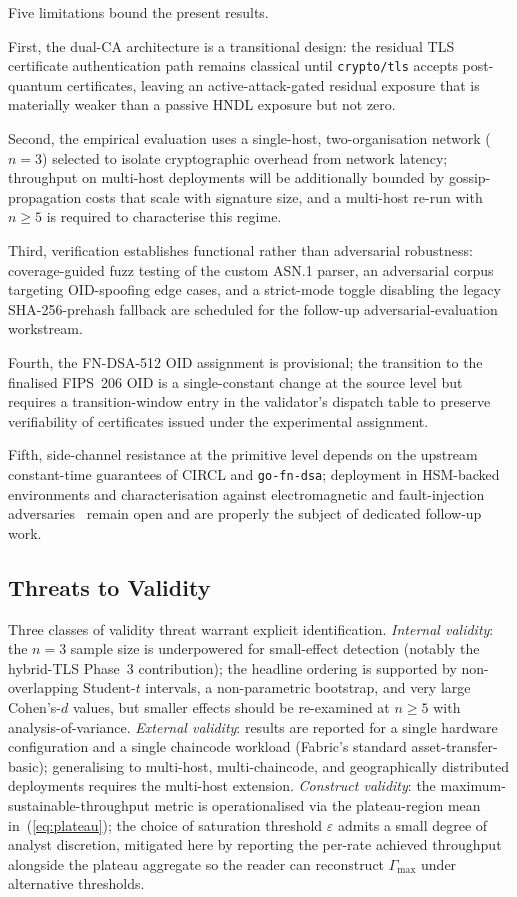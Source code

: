 \documentclass{ieeetj}
\begin{document}
Five limitations bound the present results.

First, the dual-CA architecture is a transitional design: the residual
TLS certificate authentication path remains classical until
\texttt{crypto/tls} accepts post-quantum certificates, leaving an
active-attack-gated residual exposure that is materially weaker than a
passive HNDL exposure but not zero.

Second, the empirical evaluation uses a single-host, two-organisation
network ($n=3$) selected to isolate cryptographic overhead from network
latency; throughput on multi-host deployments will be additionally bounded
by gossip-propagation costs that scale with signature size, and a
multi-host re-run with $n\geq 5$ is required to characterise this regime.

Third, verification establishes functional rather than adversarial
robustness: coverage-guided fuzz testing of the custom ASN.1 parser, an
adversarial corpus targeting OID-spoofing edge cases, and a strict-mode
toggle disabling the legacy SHA-256-prehash fallback are scheduled for the
follow-up adversarial-evaluation workstream.

Fourth, the FN-DSA-512 OID assignment is provisional; the transition to
the finalised FIPS~206 OID is a single-constant change at the source level
but requires a transition-window entry in the validator's dispatch table to
preserve verifiability of certificates issued under the experimental
assignment.

Fifth, side-channel resistance at the primitive level depends on the
upstream constant-time guarantees of CIRCL and \texttt{go-fn-dsa};
deployment in HSM-backed environments and characterisation against
electromagnetic and fault-injection adversaries~\cite{ravi2024sidechannel}
remain open and are properly the subject of dedicated follow-up work.

\subsection{Threats to Validity}
\label{sec:disc_threats}

Three classes of validity threat warrant explicit identification.
\emph{Internal validity}: the $n=3$ sample size is underpowered for
small-effect detection (notably the hybrid-TLS Phase~3 contribution); the
headline ordering is supported by non-overlapping Student-$t$ intervals,
a non-parametric bootstrap, and very large Cohen's-$d$ values, but smaller
effects should be re-examined at $n\geq 5$ with analysis-of-variance.
\emph{External validity}: results are reported for a single hardware
configuration and a single chaincode workload (Fabric's standard
asset-transfer-basic); generalising to multi-host, multi-chaincode, and
geographically distributed deployments requires the multi-host extension.
\emph{Construct validity}: the maximum-sustainable-throughput metric is
operationalised via the plateau-region mean in~(\ref{eq:plateau}); the
choice of saturation threshold $\varepsilon$ admits a small degree of
analyst discretion, mitigated here by reporting the per-rate achieved
throughput alongside the plateau aggregate so the reader can reconstruct
$\Gamma_{\max}$ under alternative thresholds.
\end{document}
